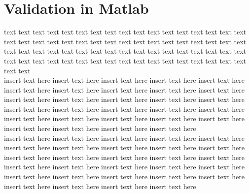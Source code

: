 \section {Validation in Matlab{\textregistered}}

text text text text text text text text text text text text text text text text text text text text text text text text text text text text text text text text text text text text text text text text text text text text text text text text text text text text text text text text text text text text text text text text text text text text text text  \\

insert text here insert text here insert text here insert text here insert text here
insert text here insert text here insert text here insert text here insert text here insert text here insert text here insert text here insert text here insert text here insert text here insert text here insert text here insert text here insert text here insert text here insert text here insert text here insert text here insert text here insert text here insert text here insert text here insert text here   \\

insert text here insert text here insert text here insert text here insert text here
insert text here insert text here insert text here insert text here insert text here insert text here insert text here insert text here insert text here insert text here insert text here insert text here insert text here insert text here insert text here insert text here insert text here insert text here insert text here insert text here insert text here insert text here insert text here insert text here   \\

